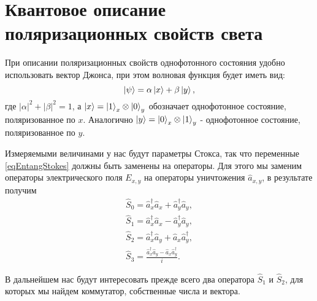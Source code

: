 \section{Квантовое описание поляризационных свойств света}
При описании поляризационных свойств однофотонного состояния удобно
использовать вектор Джонса, при этом волновая функция будет иметь вид:
\begin{equation}
\left|\psi\right> = 
\alpha \ket{x} + 
\beta \ket{y},
\label{eqEntangSimpleState}
\end{equation}
где $\left|\alpha\right|^2 + \left|\beta\right|^2 = 1$, а
$\ket{x} = \ket{1}_x\otimes\ket{0}_y$ обозначает
однофотонное состояние, поляризованное по $x$. Аналогично 
$\ket{y} = \ket{0}_x\otimes\ket{1}_y$ -
однофотонное состояние, поляризованное по $y$. 

Измеряемыми величинами у нас будут параметры Стокса, так что переменные
\eqref{eqEntangStokes} должны быть заменены на операторы. Для этого мы
заменим операторы электрического поля $E_{x,y}$ на операторы
уничтожения $\hat{a}_{x,y}$, в результате получим
\begin{eqnarray}
\hat{S}_0 = \hat{a}_x^{\dag} \hat{a}_x + \hat{a}_y^{\dag} \hat{a}_y,
\nonumber \\
\hat{S}_1 = \hat{a}_x^{\dag} \hat{a}_x - \hat{a}_y^{\dag} \hat{a}_y,
\nonumber \\
\hat{S}_2 = \hat{a}_x^{\dag} \hat{a}_y + \hat{a}_x \hat{a}_y^{\dag},
\nonumber \\
\hat{S}_3 = \frac{\hat{a}_x^{\dag} \hat{a}_y - \hat{a}_x \hat{a}_y^{\dag}}{i}.
\label{eqEntangStokesOper}
\end{eqnarray}

В дальнейшем нас будут интересовать прежде всего два оператора
$\hat{S}_1$ и $\hat{S}_2$, для которых мы найдем коммутатор,
собственные числа и вектора.

